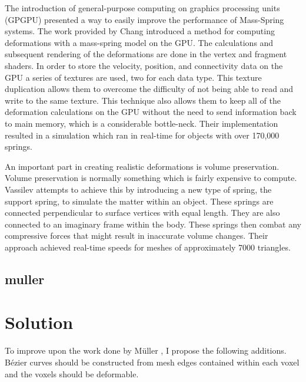 The introduction of general-purpose computing on graphics processing units (GPGPU) presented a way 
to easily improve the performance of Mass-Spring systems. The work provided by Chang \etal 
\cite{Deformable-Object-Simulation-in-Virtual-Environment} 
 introduced a method for computing deformations 
with a mass-spring model on the GPU. The calculations and subsequent rendering of the deformations 
are done in the vertex and fragment shaders. In order to store the velocity, position, and 
connectivity data on the GPU a series of textures are used, two for each data type. This texture 
duplication allows them to overcome the difficulty of not being able to read and write to the same 
texture. This technique also allows them to keep all of the deformation calculations on the GPU 
without the need to send information back to main memory, which is a considerable bottle-neck. Their 
implementation resulted in a simulation which ran in real-time for objects with over 170,000 
springs.

An important part in creating realistic deformations is volume preservation. Volume preservation is 
normally something which is fairly expensive to compute. Vassilev \etal 
\cite{Simulation-of-a-Deformable-Human-Body} 
 attempts to achieve this by introducing a new type of spring, the support spring, to simulate the 
matter within an object. These springs are connected perpendicular to surface vertices with equal 
length. They are also connected to an imaginary frame within the body. These springs then combat any 
compressive forces that might result in inaccurate volume changes. Their approach achieved real-time 
speeds for meshes of approximately 7000 triangles. 

\subsection{muller}

\section{Solution}
To improve upon the work done by Müller \etal, I propose the following additions. Bézier curves 
should be constructed from mesh edges contained within each voxel and the voxels should be 
deformable.

